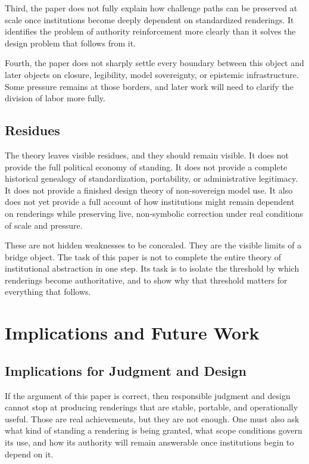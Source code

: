 \documentclass[11pt]{article}
\begin{document}
Third, the paper does not fully explain how challenge paths can be preserved at scale once institutions become deeply dependent on standardized renderings. It identifies the problem of authority reinforcement more clearly than it solves the design problem that follows from it.

Fourth, the paper does not sharply settle every boundary between this object and later objects on closure, legibility, model sovereignty, or epistemic infrastructure. Some pressure remains at those borders, and later work will need to clarify the division of labor more fully.

\subsection{Residues}

The theory leaves visible residues, and they should remain visible. It does not provide the full political economy of standing. It does not provide a complete historical genealogy of standardization, portability, or administrative legitimacy. It does not provide a finished design theory of non-sovereign model use. It also does not yet provide a full account of how institutions might remain dependent on renderings while preserving live, non-symbolic correction under real conditions of scale and pressure.

These are not hidden weaknesses to be concealed. They are the visible limits of a bridge object. The task of this paper is not to complete the entire theory of institutional abstraction in one step. Its task is to isolate the threshold by which renderings become authoritative, and to show why that threshold matters for everything that follows.

\section{Implications and Future Work}

\subsection{Implications for Judgment and Design}

If the argument of this paper is correct, then responsible judgment and design cannot stop at producing renderings that are stable, portable, and operationally useful. Those are real achievements, but they are not enough. One must also ask what kind of standing a rendering is being granted, what scope conditions govern its use, and how its authority will remain answerable once institutions begin to depend on it.
\end{document}
